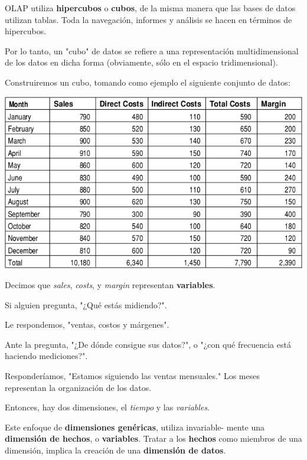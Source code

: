 \documentclass{fancyslides}
\begin{document}
\begin{frame}
\end{frame}

\begin{frame}
\misc
{
OLAP utiliza \textbf{hipercubos} o \textbf{cubos}, de la misma manera que las bases de datos utilizan tablas. Toda la navegación, informes y análisis se hacen en términos de hipercubos.

Por lo tanto, un "cubo" de datos se refiere a una representación multidimensional de los datos en dicha forma (obviamente, sólo en el espacio tridimensional).
}
\end{frame}


\begin{frame}
\misc
{
Construiremos un cubo, tomando como ejemplo el siguiente conjunto de datos:
\begin{center}
\includegraphics[scale=0.4]{cube_1}
\end{center}
}
\end{frame}


\begin{frame}
\misc
{
Decimos que \textit{sales}, \textit{costs}, y \textit{margin} representan \textbf{variables}.

Si alguien pregunta, "¿Qué estás midiendo?".

Le respondemos, "ventas, costos y márgenes".

Ante la pregunta, "¿De dónde consigue sus datos?", o "¿con qué frecuencia está haciendo mediciones?".

Responderíamos, "Estamos siguiendo las ventas mensuales." Los meses representan la organización de los datos.

Entonces, hay dos dimensiones, el \textit{tiempo} y las \textit{variables}.
\newline

Este enfoque de \textbf{dimensiones genéricas}, utiliza invariable- mente una \textbf{dimensión de hechos}, o \textbf{variables}.
Tratar a los \textbf{hechos} como miembros de una dimensión, implica la creación de una \textbf{dimensión de datos}. 
}
\end{frame}
\end{document}
